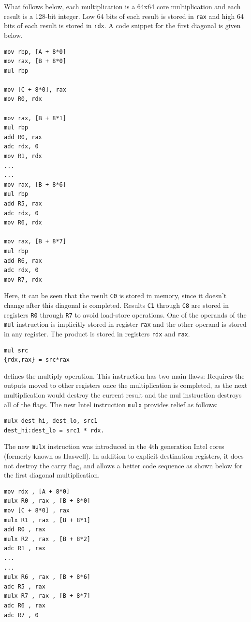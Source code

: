 \documentclass[twocolumn]{svjour3}          %
\begin{document}
What follows below, each multiplication is a 64x64 core multiplication and each result is a 128-bit integer.
%
Low 64 bits of each result is stored in \texttt{rax} and high 64 bits of each result is stored in \texttt{rdx}. A code snippet for the first diagonal is given below.


\begin{verbatim}
mov rbp, [A + 8*0]
mov rax, [B + 8*0]
mul rbp

mov [C + 8*0], rax
mov R0, rdx

mov rax, [B + 8*1]
mul rbp
add R0, rax
adc rdx, 0
mov R1, rdx
...
...
mov rax, [B + 8*6]
mul rbp
add R5, rax
adc rdx, 0
mov R6, rdx

mov rax, [B + 8*7]
mul rbp
add R6, rax
adc rdx, 0
mov R7, rdx
\end{verbatim}

Here, it can be seen that the result \texttt{C0} is stored in memory, since it doesn't change after this diagonal is completed. Results \texttt{C1} through \texttt{C8} are stored in registers \texttt{R0} through \texttt{R7} to avoid load-store operations. One of the operands of the \texttt{mul} instruction is implicitly stored in register \texttt{rax} and the other operand is stored in any register. The product is stored in registers \texttt{rdx} and \texttt{rax}. 
\begin{verbatim}
mul src
{rdx,rax} = src*rax
\end{verbatim}
defines the multiply operation. This instruction has two main flaws: Requires the outputs moved to other registers once the multiplication is completed, as the next multiplication would destroy the current result and the mul instruction destroys all of the flags.
%
The new Intel instruction \texttt{mulx} provides relief as follows:
\begin{verbatim}
mulx dest_hi, dest_lo, src1
dest_hi:dest_lo = src1 * rdx.
\end{verbatim}
The new \texttt{mulx} instruction was introduced in the 4th generation Intel cores (formerly known as Haswell). In addition to explicit destination registers, it does not destroy the carry flag, and allows a better code sequence as shown below for the first diagonal multiplication.
\begin{verbatim}
mov rdx , [A + 8*0]
mulx R0 , rax , [B + 8*0]
mov [C + 8*0] , rax
mulx R1 , rax , [B + 8*1]
add R0 , rax
mulx R2 , rax , [B + 8*2]
adc R1 , rax
...
...
mulx R6 , rax , [B + 8*6]
adc R5 , rax
mulx R7 , rax , [B + 8*7]
adc R6 , rax
adc R7 , 0
\end{verbatim}
\end{document}
